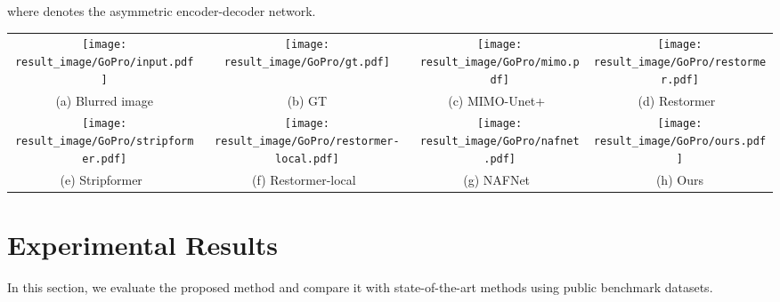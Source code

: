 \documentclass[10pt,twocolumn,letterpaper]{article}
\begin{document}
where  denotes the asymmetric encoder-decoder network.

\begin{figure*}[t]
\footnotesize
\centering
    \begin{tabular}{cccc}
    \texttt{[image: result\_image/GoPro/input.pdf]}&\hspace{-4.5mm}
    \texttt{[image: result\_image/GoPro/gt.pdf]}&\hspace{-4.5mm}
    \texttt{[image: result\_image/GoPro/mimo.pdf]}&\hspace{-4.5mm}
    \texttt{[image: result\_image/GoPro/restormer.pdf]}\\
    \hspace{-4.5mm}(a) Blurred image &\hspace{-4.5mm} (b) GT &\hspace{-4.5mm}(c) MIMO-Unet+~\cite{MIMO} &\hspace{-4.5mm}(d) Restormer~\cite{Restormer}\\
    \texttt{[image: result\_image/GoPro/stripformer.pdf]} &\hspace{-4.5mm}
    \texttt{[image: result\_image/GoPro/restormer-local.pdf]} &\hspace{-4.5mm}
    \texttt{[image: result\_image/GoPro/nafnet.pdf]} &\hspace{-4.5mm}
    \texttt{[image: result\_image/GoPro/ours.pdf]}\\
\hspace{-4.5mm} (e) Stripformer~\cite{Stripformer}  &\hspace{-4.5mm} (f) Restormer-local~\cite{TLC} &\hspace{-4.5mm} (g) NAFNet~\cite{NAFNet} &\hspace{-4.5mm} (h) Ours
    \end{tabular}
\vspace{-2mm}
    \caption{Deblurred results on the GoPro dataset~\cite{GoPro}. The deblurred results in (c)-(g) still contain significant blur effects. The proposed method generates a clearer image. For example, the characters and boundaries are much clearer.}
    \label{fig:GoPro_result}
\vspace{-4mm}
\end{figure*}



\section{Experimental Results}
\label{sec:experiment}
In this section, we evaluate the proposed method and compare it with state-of-the-art methods using public benchmark datasets.
\end{document}
